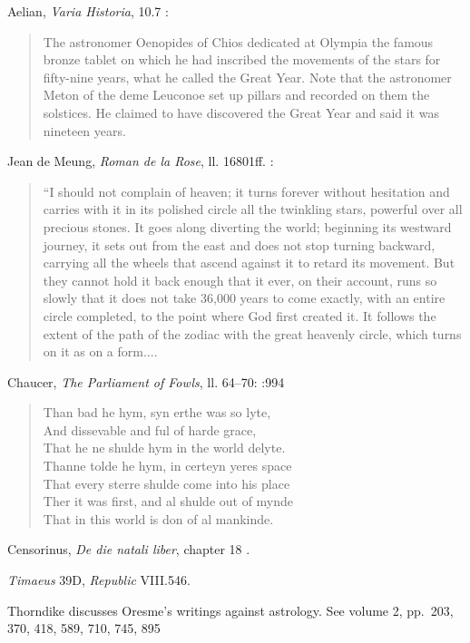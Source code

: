 \documentclass{article}
\begin{document}
Aelian, {\em Varia Historia}, 10.7 \cite[p.~319]{aelian}:

\begin{quote}
The astronomer Oenopides of Chios dedicated at Olympia
the famous bronze tablet on which he had inscribed the movements
of the stars for fifty-nine years, what he called the Great Year.
Note that the astronomer Meton of the deme Leuconoe set up
pillars and recorded on them the solstices. He claimed to have discovered
the Great Year and said it was nineteen years.
\end{quote}

Jean de Meung, {\em Roman de la Rose}, ll. 16801ff. \cite[pp.~282--283]{dahlberg}:

\begin{quote}
``I should not complain of heaven; it turns forever without hesitation and carries with it in its polished circle all the twinkling stars, powerful over all precious
stones. It goes along diverting the world; beginning its westward journey, it sets out from the east and does not stop turning backward, carrying all the wheels
that ascend against it to retard its movement. But they cannot hold it back enough that it ever, on their account, runs so slowly that it does not take
36,000 years to come exactly, with an entire circle completed, to the point where God first created it. It follows the extent of the path of the zodiac
with the great heavenly circle, which turns on it as on a form....
\end{quote}

Chaucer, {\em The Parliament of Fowls}, ll. 64--70: \cite[p.~386]{chaucer}:994

\begin{quote}
Than bad he hym, syn erthe was so lyte,\\
And dissevable and ful of harde grace,\\
That he ne shulde hym in the world delyte.\\
Thanne tolde he hym, in certeyn yeres space\\
That every sterre shulde come into his place\\
Ther it was first, and al shulde out of mynde\\
That in this world is don of al mankinde.
\end{quote}


Censorinus, {\em De die natali liber}, chapter 18 \cite{censorinus}.

{\em Timaeus} 39D, {\em Republic} VIII.546.

Thorndike \cite[pp.~398--423, Chapter XXV]{magicIII} discusses Oresme's writings against astrology.
See volume 2, pp.~203, 370, 418, 589, 710, 745, 895
\end{document}
